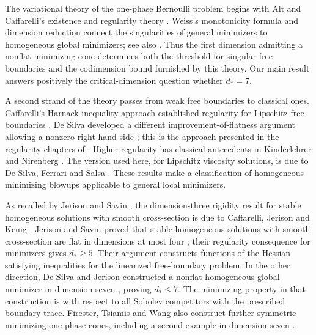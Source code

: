 The variational theory of the one-phase Bernoulli problem begins with
Alt and Caffarelli's existence and regularity theory
\cite{AltCaffarelli1981}.  Weiss's monotonicity formula and dimension
reduction \cite{Weiss1999} connect the singularities of general minimizers
to homogeneous global minimizers; see also
\cite[Theorem~1.4 and Chapters~9--10]{Velichkov2023}.
Thus the first dimension admitting a nonflat minimizing cone determines
both the threshold for singular free boundaries and the codimension
bound furnished by this theory.  Our main result answers positively
the critical-dimension question whether $d_*=7$.

A second strand of the theory passes from weak free boundaries to
classical ones. Caffarelli's Harnack-inequality approach established
regularity for Lipschitz free boundaries \cite{Caffarelli1987}.
De Silva developed a different improvement-of-flatness argument allowing
a nonzero right-hand side \cite[Theorems~1.1--1.2]{DeSilva2011}; this is the approach
presented in the regularity chapters of \cite{Velichkov2023}.
Higher regularity has classical antecedents in Kinderlehrer and Nirenberg
\cite[Theorem~2]{KinderlehrerNirenberg1977}. The version used here, for
Lipschitz viscosity solutions, is due to De Silva, Ferrari and Salsa
\cite[Theorem~1.1 and Corollary~1.2]{DeSilvaFerrariSalsa2019}.
These results make a classification of
homogeneous minimizing blowups applicable to general local minimizers.

As recalled by Jerison and Savin \cite[Introduction]{JerisonSavin2015},
the dimension-three rigidity result for stable homogeneous solutions
with smooth cross-section is due to Caffarelli, Jerison and Kenig
\cite{CaffarelliJerisonKenig2004}.
Jerison and Savin proved that stable homogeneous solutions with smooth
cross-section are flat in dimensions at most four
\cite[Theorem~1.1]{JerisonSavin2015}; their regularity consequence for
minimizers \cite[Corollary~1.2]{JerisonSavin2015} gives $d_*\geq5$.
Their argument constructs functions of the Hessian satisfying
inequalities for the linearized free-boundary problem.  In the other
direction, De Silva and Jerison constructed a nonflat homogeneous
global minimizer in dimension seven
\cite[Theorem~1.1]{DeSilvaJerison2009}, proving $d_*\leq7$.
The minimizing property in that construction is with respect to all
Sobolev competitors with the prescribed boundary trace. Firester,
Tsiamis and Wang also construct further symmetric minimizing
one-phase cones, including a second example in dimension seven
\cite[Theorem~1.4]{FiresterTsiamisWang2026Capillary}.

